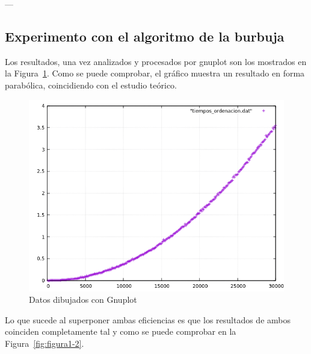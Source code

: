 \newpage
---
\subsection{Experimento con el algoritmo de la burbuja}


\newpage

Los resultados, una vez analizados y procesados por gnuplot son los mostrados en
la Figura~\ref{fig:figura1-1}. Como se puede comprobar, el gráfico muestra un resultado en forma parabólica, coincidiendo con el estudio teórico.

\begin{figure}[H] %
\centering
\includegraphics[scale=0.6]{ejercicio1/ejercicio1.png}  %
\caption{Datos dibujados con Gnuplot} 
\label{fig:figura1-1}
\end{figure}
Lo que sucede al superponer ambas eficiencias es que los resultados de ambos coinciden completamente tal y como se puede comprobar en la Figura~\ref{fig:figura1-2}.

